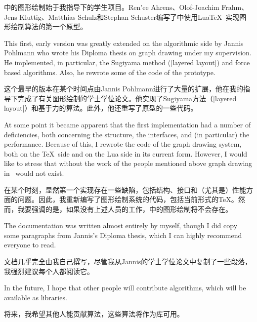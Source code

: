 \tikzname 中的图形绘制始于我指导下的学生项目。Ren'ee Ahrens、Olof-Joachim Frahm、Jens Kluttig、Matthias Schulz和Stephan Schuster编写了\tikzname 中使用Lua\TeX\ 实现图形绘制算法的第一个原型。

This first, early version was greatly extended on the algorithmic side by
Jannis Pohlmann who wrote his Diploma thesis on graph drawing under my
supervision. He implemented, in particular, the Sugiyama method
(|layered layout|) and force based algorithms. Also, he rewrote some of the
code of the prototype.

这个最早的版本在某个时间点由Jannis Pohlmann进行了大量的扩展，他在我的指导下完成了有关图形绘制的学士学位论文。他实现了Sugiyama方法（|layered layout|）和基于力的算法。此外，他还重写了原型的一些代码。

At some point it became apparent that the first implementation had a number of
deficiencies, both concerning the structure, the interfaces, and (in
particular) the performance. Because of this, I rewrote the code of the graph
drawing system, both on the \TeX\ side and on the Lua side in its current form.
However, I would like to stress that without the work of the people mentioned
above graph drawing in \tikzname\ would not exist.

在某个时刻，显然第一个实现存在一些缺陷，包括结构、接口和（尤其是）性能方面的问题。因此，我重新编写了图形绘制系统的代码，包括当前形式的\TeX{}。然而，我要强调的是，如果没有上述人员的工作，\tikzname 中的图形绘制将不会存在。

The documentation was written almost entirely by myself, though I did copy some
paragraphs from Jannis's Diploma thesis, which I can highly recommend everyone
to read.

文档几乎完全由我自己撰写，尽管我从Jannis的学士学位论文中复制了一些段落，我强烈建议每个人都阅读它。
 
In the future, I hope that other people will contribute algorithms, which will
be available as libraries.

将来，我希望其他人能贡献算法，这些算法将作为库可用。

